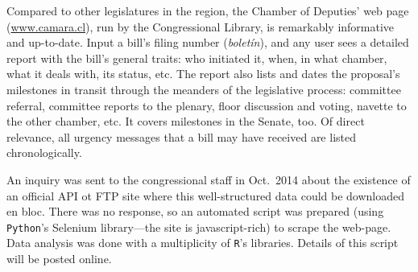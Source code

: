 \documentclass[letter,12pt]{article}
\begin{document}
Compared to other legislatures in the region, the Chamber of Deputies' web page (\url{www.camara.cl}), run by the Congressional Library, is remarkably informative and up-to-date. Input a bill's filing number (\emph{boletín}), and any user sees a detailed report with the bill's general traits: who initiated it, when, in what chamber, what it deals with, its status, etc. The report also lists and dates the proposal's milestones in transit through the meanders of the legislative process: committee referral, committee reports to the plenary, floor discussion and voting, navette to the other chamber, etc. It covers milestones in the Senate, too. Of direct relevance, all urgency messages that a bill may have received are listed chronologically. 

An inquiry was sent to the congressional staff in Oct.\ 2014 about the existence of an official API ot FTP site where this well-structured data could be downloaded en bloc. There was no response, so an automated script was prepared (using \texttt{Python}'s Selenium library---the site is javascript-rich) to scrape the web-page. Data analysis was done with a multiplicity of \texttt{R}'s libraries. Details of this script will be posted online. 
\end{document}
